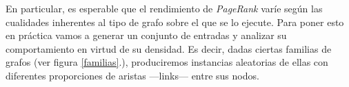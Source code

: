 \vspace{1em}
En particular, es esperable que el rendimiento de \textit{PageRank} varíe según las cualidades inherentes al tipo de grafo sobre el que se lo ejecute.
Para poner esto en práctica vamos a generar un conjunto de entradas y analizar su comportamiento en virtud de su densidad.
Es decir, dadas ciertas familias de grafos (ver figura \ref{familias}.), produciremos instancias aleatorias de ellas con diferentes proporciones de aristas ---links--- entre sus nodos.

\begin{figure}[!htbp]
    \centering
    \newline

\end{figure}
